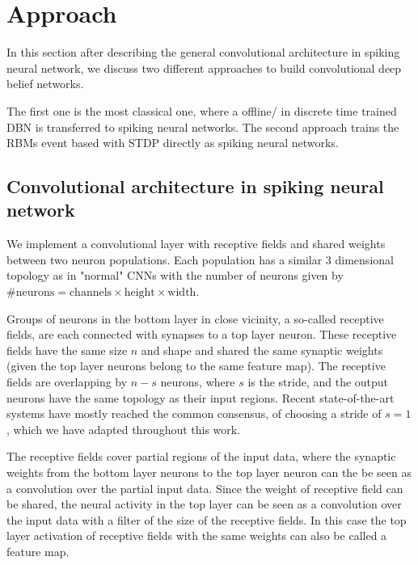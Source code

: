 \chapter{Approach}

In this section after describing the general convolutional architecture in spiking neural network, we discuss two different approaches to build convolutional deep belief networks.

The first one is the most classical one, where a offline/ in discrete time trained DBN is transferred to spiking neural networks.
The second approach trains the RBMs event based with STDP directly as spiking neural networks. 

\section{Convolutional architecture in spiking neural network}

We implement a convolutional layer with receptive fields and shared weights between two neuron populations. 
Each population has a similar 3 dimensional topology as in "normal" CNNs with the number of neurons given by $\# \text{neurons} = \text{channels} \times \text{height} \times \text{width}$.

Groups of neurons in the bottom layer in close vicinity, a so-called receptive fields, are each connected with synapses to a top layer neuron.
These receptive fields have the same size $n$ and shape and shared the same synaptic weights (given the top layer neurons belong to the same feature map).
The receptive fields are overlapping by $n-s$ neurons, where $s$ is the stride, and the output neurons have the same topology as their input regions. 
Recent state-of-the-art systems have mostly reached the common consensus, of choosing a stride of $s=1$, which we have adapted throughout this work.

The receptive fields cover partial regions of the input data, where the synaptic weights from the bottom layer neurons to the top layer neuron can the be seen as a convolution over the partial input data.
Since the weight of receptive field can be shared, the neural activity in the top layer can be seen as a convolution over the input data with a filter of the size of the receptive fields.
In this case the top layer activation of receptive fields with the same weights can also be called a feature map.

